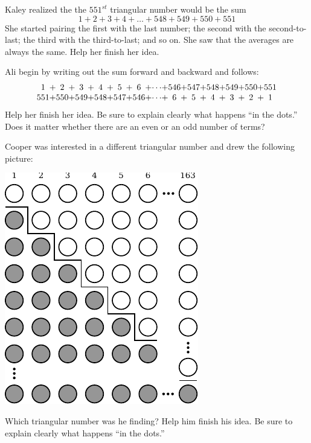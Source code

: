 \documentclass{ximera}
\begin{document}
\begin{problem}
Kaley realized the the $551^{st}$ triangular number would be the sum 
\[
1+2+3+4+\dots+548+549+550+551
\]
She started pairing the first with the last number; the second with the second-to-last; the third with the third-to-last; and so on.  She saw that the averages are always the same.  Help her finish her idea.  
\end{problem}

\begin{problem}
Ali begin by writing out the sum forward and backward and follows:  
\[
\begin{array}{c@{ + }c@{ + }c@{ + }c@{ + }c@{ + }c@{ + }c@{ + }c@{ + }c@{ + }c@{ + }c@{ + }c@{ + }c}
1 & 2 & 3 & 4 & 5 & 6 & \cdots & 546 & 547 & 548 & 549 & 550 & 551 \\
551 & 550 & 549 & 548 & 547 & 546 & \cdots & 6 & 5 & 4 & 3 & 2 & 1 
\end{array}
\]
Help her finish her idea.  Be sure to explain clearly what happens ``in the dots.''  Does it matter whether there are an even or an odd number of terms?  
\end{problem}

\begin{problem}
Cooper was interested in a different triangular number and drew the following picture:   
\begin{image}
\includegraphics{graphics/sum1.pdf}
\end{image}
Which triangular number was he finding?  Help him finish his idea.  Be sure to explain clearly what 
happens ``in the dots.'' 
\end{problem}
\end{document}
